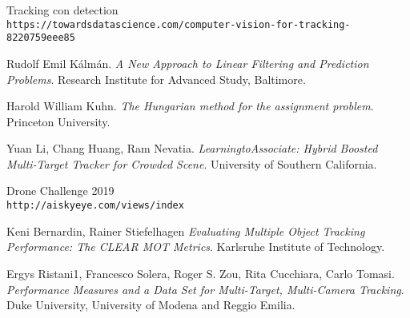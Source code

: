 \begin{thebibliography}{99}
Tracking con detection
\\\texttt{https://towardsdatascience.com/computer-vision-for-tracking-8220759eee85}

Rudolf Emil Kálmán.
\textit{A New Approach to Linear Filtering
and Prediction Problems}. Research Institute for Advanced Study, Baltimore.

Harold William Kuhn.
\textit{The Hungarian method for the assignment problem}. Princeton University.

Yuan Li, Chang Huang, Ram Nevatia.
\textit{LearningtoAssociate: Hybrid Boosted Multi-Target Tracker for Crowded Scene}. University of Southern California.

Drone Challenge 2019
\\\texttt{http://aiskyeye.com/views/index}

Keni Bernardin, Rainer Stiefelhagen
\textit{Evaluating Multiple Object Tracking Performance: The CLEAR MOT Metrics}. Karlsruhe Institute of Technology.

Ergys Ristani1, Francesco Solera, Roger S. Zou, Rita Cucchiara, Carlo Tomasi.
\textit{Performance Measures and a Data Set for Multi-Target, Multi-Camera Tracking}.  Duke University,  University of Modena and Reggio Emilia.

\end{thebibliography}